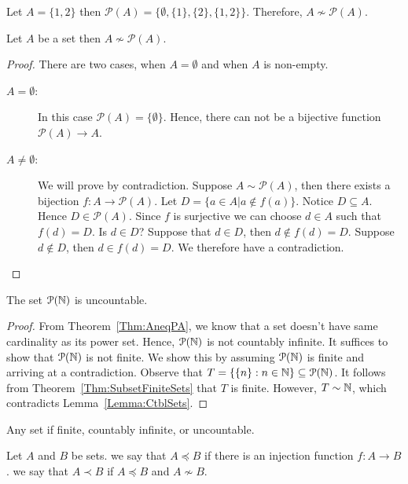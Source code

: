 \documentclass[a4paper,english,12pt]{article}   	%
\begin{document}
\begin{exmp} Let $A=\{1,2\}$ then $\mathcal{P}(A) =\{ \emptyset,\{1\},\{2\},\{1,2\} \}$. Therefore, $A \nsim \mathcal{P}(A)$.
\end{exmp}
\begin{thm}\label{Thm:AneqPA} Let $A$ be a set then $A \nsim \mathcal{P}(A) $.
\end{thm}
\begin{proof} There are two cases, when $A = \emptyset$ and when $A$ is non-empty. 
\begin{description}
\item[$A = \emptyset$:] In this case $\mathcal{P}(A) = \{ \emptyset \}$. Hence, there can not be a bijective function $\mathcal{P}(A) \to A$. %
\item[$A \neq \emptyset$:] We will prove by contradiction. Suppose $A \sim \mathcal{P}(A)$, then there exists a bijection $f \colon A \to \mathcal{P}(A)$. Let $D=\{a \in A  | a \notin f(a)\}$. Notice $D \subseteq A$. Hence $D \in \mathcal{P}(A)$. Since $f$ is surjective we can choose $d \in A$ such that $f(d)=D$. Is $d \in D$? Suppose that $d \in D$, then $d \notin f(d)=D$. Suppose $d \notin D$, then $d \in f(d)=D$. We therefore have a contradiction. %
\end{description} 
\end{proof}
\begin{cor} The set $\mathcal{P}(\mathbb{N})$ is uncountable.
\end{cor}
\begin{proof} From Theorem~\ref{Thm:AneqPA}, we know that a set doesn't have same cardinality as its power set. Hence, $\mathcal{P}(\mathbb{N})$ is not countably infinite. It suffices to show that $\mathcal{P}(\mathbb{N})$ is not finite. We show this by assuming $\mathcal{P}(\mathbb{N})$ is finite and arriving at a contradiction. Observe that $T = \{\{n\}: n \in \mathbb{N}\} \subseteq \mathcal{P}(\mathbb{N})$. It follows from Theorem~\ref{Thm:SubsetFiniteSets} that $T$ is finite. However, $T \sim \mathbb{N}$, which contradicts Lemma~\ref{Lemma:CtblSets}.
\end{proof}
\begin{rem} Any set if finite, countably infinite, or uncountable.
\end{rem}
\begin{defn} Let $A$ and $B$ be sets. we say that $A \preccurlyeq B$ if there is an injection function $f \colon A \to B$. we say that $A \prec B$ if $A \preccurlyeq B$ and $A \nsim B$.
\end{defn}
\end{document}
